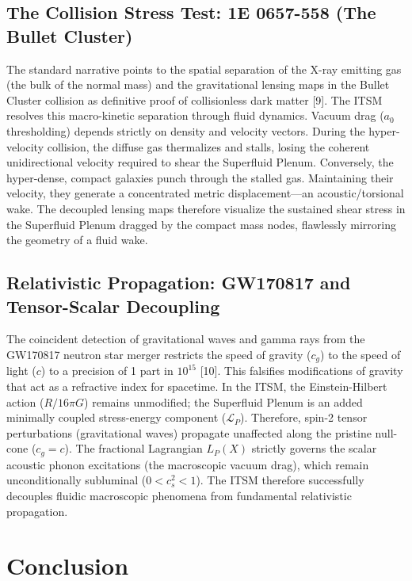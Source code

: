 \documentclass[aps,prd,onecolumn,linenumbers,superscriptaddress,nofootinbib]{revtex4-2}
\begin{document}
\subsection{The Collision Stress Test: 1E 0657-558 (The Bullet Cluster)}
The standard narrative points to the spatial separation of the X-ray emitting gas (the bulk of the normal mass) and the gravitational lensing maps in the Bullet Cluster collision as definitive proof of collisionless dark matter [9]. The ITSM resolves this macro-kinetic separation through fluid dynamics. Vacuum drag ($a_0$ thresholding) depends strictly on density and velocity vectors. During the hyper-velocity collision, the diffuse gas thermalizes and stalls, losing the coherent unidirectional velocity required to shear the Superfluid Plenum. Conversely, the hyper-dense, compact galaxies punch through the stalled gas. Maintaining their velocity, they generate a concentrated metric displacement—an acoustic/torsional wake. The decoupled lensing maps therefore visualize the sustained shear stress in the Superfluid Plenum dragged by the compact mass nodes, flawlessly mirroring the geometry of a fluid wake.

\subsection{Relativistic Propagation: GW170817 and Tensor-Scalar Decoupling}
The coincident detection of gravitational waves and gamma rays from the GW170817 neutron star merger restricts the speed of gravity ($c_g$) to the speed of light ($c$) to a precision of 1 part in $10^{15}$ [10]. This falsifies modifications of gravity that act as a refractive index for spacetime. In the ITSM, the Einstein-Hilbert action ($R / 16\pi G$) remains unmodified; the Superfluid Plenum is an added minimally coupled stress-energy component ($\mathcal{L}_P$). Therefore, spin-2 tensor perturbations (gravitational waves) propagate unaffected along the pristine null-cone ($c_g = c$). The fractional Lagrangian $L_P(X)$ strictly governs the scalar acoustic phonon excitations (the macroscopic vacuum drag), which remain unconditionally subluminal ($0 < c_s^2 < 1$). The ITSM therefore successfully decouples fluidic macroscopic phenomena from fundamental relativistic propagation.

\section{Conclusion}
\end{document}
